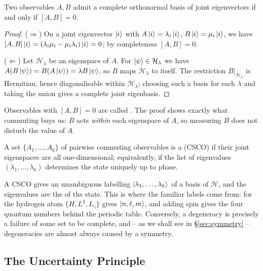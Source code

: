 \documentclass[a4paper]{scrartcl}
\begin{document}
\begin{theorem}[Compatibility]
    Two observables $A, B$ admit a complete orthonormal basis of joint eigenvectors if and only if $[A,B] = 0$.
\end{theorem}
\begin{proof}
    ($\Rightarrow$) On a joint eigenvector $\ket{i}$ with $A\ket{i} = \lambda_i\ket{i}$, $B\ket{i} = \mu_i\ket{i}$, we have $[A,B]\ket{i} = (\lambda_i\mu_i - \mu_i\lambda_i)\ket{i} = 0$; by completeness $[A,B] = 0$.

    ($\Leftarrow$) Let $\mathcal{H}_\lambda$ be an eigenspace of $A$. For $\ket{\psi} \in \mathcal{H}_\lambda$ we have $A(B\ket{\psi}) = B(A\ket{\psi}) = \lambda B\ket{\psi}$, so $B$ maps $\mathcal{H}_\lambda$ to itself. The restriction $B|_{\mathcal{H}_\lambda}$ is Hermitian, hence diagonalisable within $\mathcal{H}_\lambda$; choosing such a basis for each $\lambda$ and taking the union gives a complete joint eigenbasis.
\end{proof}

Observables with $[A,B] = 0$ are called . The proof shows exactly what commuting buys us: $B$ acts \emph{within} each eigenspace of $A$, so measuring $B$ does not disturb the value of $A$.

\begin{definition}
    A set $\{A_1, \dots, A_k\}$ of pairwise commuting observables is a  (CSCO) if their joint eigenspaces are all one-dimensional; equivalently, if the list of eigenvalues $(\lambda_1, \dots, \lambda_k)$ determines the state uniquely up to phase.
\end{definition}

A CSCO gives an unambiguous labelling $\ket{\lambda_1, \dots, \lambda_k}$ of a basis of $\mathcal{H}$, and the eigenvalues are the  of the state. This is where the familiar labels come from: for the hydrogen atom $\{H, L^2, L_z\}$ gives $\ket{n, \ell, m}$, and adding spin gives the four quantum numbers behind the periodic table. Conversely, a degeneracy is precisely a failure of some set to be complete, and -- as we shall see in \S\ref{sec:symmetry} -- degeneracies are almost always caused by a symmetry.

\subsection{The Uncertainty Principle}
\end{document}
